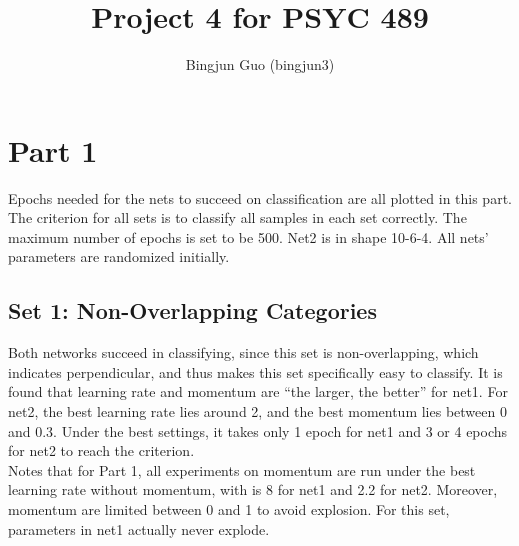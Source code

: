 \documentclass{article}
\title{Project 4 for PSYC 489}
\author{Bingjun Guo (bingjun3)}
\begin{document}
\maketitle

\section*{Part 1}
Epochs needed for the nets to succeed on classification are all plotted in this part. The criterion for all sets is to classify all samples in each set correctly. The maximum number of epochs is set to be 500. Net2 is in shape 10-6-4. All nets' parameters are randomized initially.
\subsection*{Set 1: Non-Overlapping Categories}
Both networks succeed in classifying, since this set is non-overlapping, which indicates perpendicular, and thus makes this set specifically easy to classify. It is found that learning rate and momentum are ``the larger, the better'' for net1. For net2, 
the best learning rate lies around 2, and the best momentum lies between 0 and 0.3. Under the best settings, it takes only 1 epoch for net1 and 3 or 4 epochs for net2 to reach the criterion.
\\Notes that for Part 1, all experiments on momentum are run under the best learning rate without momentum, with is 8 for net1 and 2.2 for net2. Moreover, momentum are limited between 0 and 1 to avoid explosion. For this set, parameters in net1 actually never explode.
\end{document}
